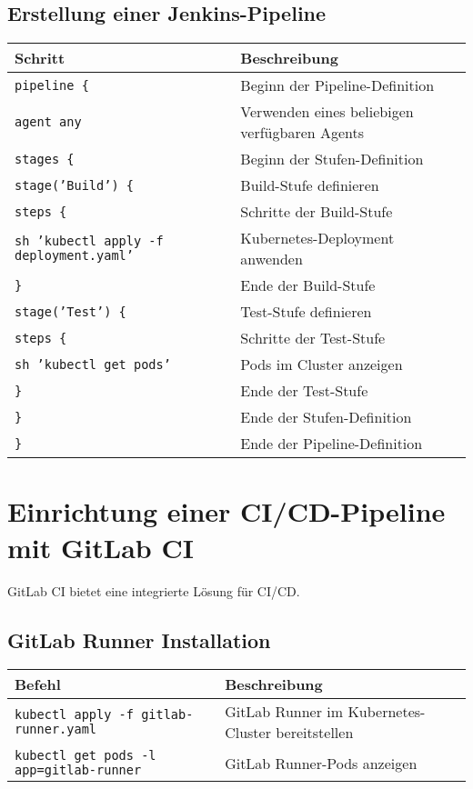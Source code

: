 \subsection{Erstellung einer Jenkins-Pipeline}
\noindent
\begin{tabular}{|l|l|}
\hline
\textbf{Schritt} & \textbf{Beschreibung} \\
\hline
\texttt{pipeline \{} & Beginn der Pipeline-Definition \\
\texttt{agent any} & Verwenden eines beliebigen verfügbaren Agents \\
\texttt{stages \{} & Beginn der Stufen-Definition \\
\texttt{stage('Build') \{} & Build-Stufe definieren \\
\texttt{steps \{} & Schritte der Build-Stufe \\
\texttt{sh 'kubectl apply -f deployment.yaml'} & Kubernetes-Deployment anwenden \\
\texttt{\}} & Ende der Build-Stufe \\
\texttt{stage('Test') \{} & Test-Stufe definieren \\
\texttt{steps \{} & Schritte der Test-Stufe \\
\texttt{sh 'kubectl get pods'} & Pods im Cluster anzeigen \\
\texttt{\}} & Ende der Test-Stufe \\
\texttt{\}} & Ende der Stufen-Definition \\
\texttt{\}} & Ende der Pipeline-Definition \\
\hline
\end{tabular}

\section{Einrichtung einer CI/CD-Pipeline mit GitLab CI}
GitLab CI bietet eine integrierte Lösung für CI/CD.

\subsection{GitLab Runner Installation}
\noindent
\begin{tabular}{|l|l|}
\hline
\textbf{Befehl} & \textbf{Beschreibung} \\
\hline
\texttt{kubectl apply -f gitlab-runner.yaml} & GitLab Runner im Kubernetes-Cluster bereitstellen \\
\texttt{kubectl get pods -l app=gitlab-runner} & GitLab Runner-Pods anzeigen \\
\hline
\end{tabular}

